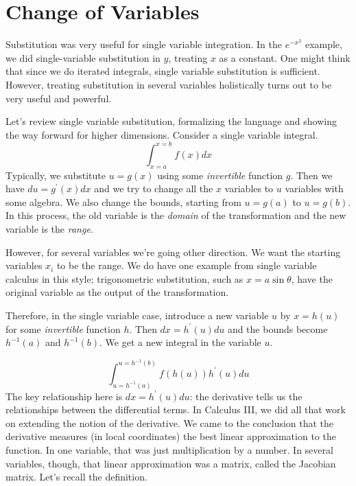 \documentclass[fleqn,letterpaper]{report}
\begin{document}
\section{Change of Variables}
\label{change-of-variables}

Substitution was very useful for single variable integration.
In the $e^{-x^2}$ example, we did single-variable substitution
in $y$, treating $x$ as a constant. One might think that
since we do iterated integrals, single variable substitution
is sufficient. However, treating substitution in several
variables holistically turns out to be very useful and
powerful.

Let's review single variable substitution, formalizing the
language and showing the way forward for higher dimensions.
Consider a single variable integral.
\begin{equation*}
\int_{x=a}^{x=b} f(x) dx
\end{equation*}
Typically, we substitute $u = g(x)$ using some
\emph{invertible} function $g$. Then we have $du =
g^\prime(x) dx$ and we try to change all the $x$ variables to
$u$ variables with some algebra. We also change the bounds,
starting from $u = g(a)$ to $u = g(b)$. In this process, the
old variable is the \emph{domain} of the transformation and
the new variable is the \emph{range}.

However, for several variables we're going other direction.
We want the starting variables $x_i$ to be the range. We do
have one example from single variable calculus in this style;
trigonometric substitution, such as $x = a \sin \theta$, have
the original variable as the output of the transformation. 

Therefore, in the single variable case, introduce a new
variable $u$ by $x = h(u)$ for some \emph{invertible} function
$h$. Then $dx = h^\prime(u) du$ and the bounds become
$h^{-1}(a)$ and $h^{-1}(b)$. We get a new integral in the
variable $u$.

\begin{equation*}
\int_{u=h^{-1}(a)}^{u=h^{-1}(b)} f(h(u)) h^\prime(u) du 
\end{equation*}
The key relationship here is $dx = h^\prime(u) du$: the
derivative tells us the relationships between the differential
terms. In Calculus III, we did all that work on extending the
notion of the derivative. We came to the conclusion that the
derivative measures (in local coordinates) the best linear
approximation to the function. In one variable, that was just
multiplication by a number. In several variables, though,
that linear approximation was a matrix, called the Jacobian
matrix. Let's recall the definition. 
\end{document}
